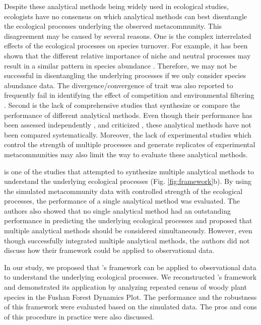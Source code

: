 Despite these analytical methods being widely used in ecological studies, ecologists have no consensus on which analytical methods can best disentangle the ecological processes underlying the observed metacommunity. This disagreement may be caused by several reasons. One is the complex interrelated effects of the ecological processes on species turnover. For example, it has been shown that the different relative importance of niche and neutral processes may result in a similar pattern in species abundance \citep{chave2002comparing, mcgill2010towards}. Therefore, we may not be successful in disentangling the underlying processes if we only consider species abundance data. The divergence/convergence of trait was also reported to frequently fail in identifying the effect of competition and environmental filtering \citep{mayfield2010opposing}. Second is the lack of comprehensive studies that synthesize or compare the performance of different analytical methods. Even though their performance has been assessed independently \citep{mcgill2006empirical, vellend2014assessing, tucker2016differentiating, ning2019general}, and criticized \citep{smith2010variation, molina2020difficulties, brown2017making}, these analytical methods have not been compared systematically. Moreover, the lack of experimental studies which control the strength of multiple processes and generate replicates of experimental metacommunities may also limit the way to evaluate these analytical methods. 

\citet{guzman2022accounting} is one of the studies that attempted to synthesize multiple analytical methods to understand the underlying ecological processes (Fig. \ref{fig:framework}b). By using the simulated metacommunity data with controlled strength of the ecological processes, the performance of a single analytical method was evaluated. The authors also showed that no single analytical method had an outstanding performance in predicting the underlying ecological processes and proposed that multiple analytical methods should be considered simultaneously. However, even though \citet{guzman2022accounting} successfully integrated multiple analytical methods, the authors did not discuss how their framework could be applied to observational data.

In our study, we proposed that \citeauthor{guzman2022accounting}'s framework can be applied to observational data to understand the underlying ecological processes. We reconstructed \citeauthor{guzman2022accounting}'s framework and demonstrated its application by analyzing repeated census of woody plant species in the Fushan Forest Dynamics Plot. The performance and the robustness of this framework were evaluated based on the simulated data. The pros and cons of this procedure in practice were also discussed.


